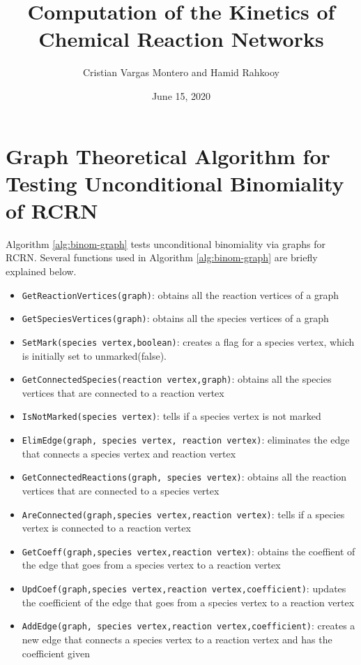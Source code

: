 \documentclass[11pt]{article}
\begin{document}
\title{Computation of the Kinetics of Chemical Reaction Networks}
\date{June 15, 2020}
\author{Cristian Vargas Montero and Hamid Rahkooy}
\maketitle

\section*{Graph Theoretical Algorithm for Testing Unconditional Binomiality of RCRN}

Algorithm \ref{alg:binom-graph} tests unconditional binomiality via graphs for RCRN. Several functions used in Algorithm \ref{alg:binom-graph} are
briefly explained below.
\begin{itemize}
\item \texttt{GetReactionVertices(graph)}: obtains all the reaction vertices of a graph
\item \texttt{GetSpeciesVertices(graph)}: obtains all the species vertices of a graph
\item \texttt{SetMark(species vertex,boolean)}: creates a flag for a species
  vertex, which is initially set to unmarked(false).
\item \texttt{GetConnectedSpecies(reaction vertex,graph)}: obtains all the
  species vertices that are connected to a reaction vertex
\item \texttt{IsNotMarked(species vertex)}: tells if a species vertex is not marked
\item \texttt{ElimEdge(graph, species vertex, reaction vertex)}:
  eliminates the edge that connects a species vertex and reaction
  vertex
\item \texttt{GetConnectedReactions(graph, species vertex)}: obtains all the
  reaction vertices that are connected to a species vertex
\item \texttt{AreConnected(graph,species vertex,reaction vertex)}: tells if a
  species vertex is connected to a reaction vertex
\item \texttt{GetCoeff(graph,species vertex,reaction vertex)}: obtains the
  coeffient of the edge that goes from a species vertex to a reaction
  vertex
\item \texttt{UpdCoef(graph,species vertex,reaction vertex,coefficient)}:
  updates the coefficient of the edge that goes from a species vertex
  to a reaction vertex
\item \texttt{AddEdge(graph, species vertex,reaction vertex,coefficient)}:
  creates a new edge that connects a species vertex to a reaction
  vertex and has the coefficient given
\end{itemize}
\end{document}
